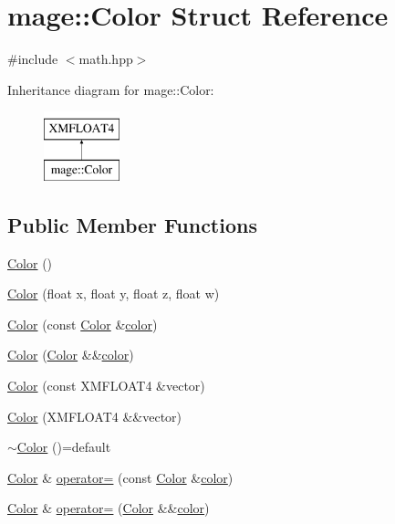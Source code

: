 \hypertarget{structmage_1_1_color}{}\section{mage\+:\+:Color Struct Reference}
\label{structmage_1_1_color}


{\ttfamily \#include $<$math.\+hpp$>$}

Inheritance diagram for mage\+:\+:Color\+:\begin{figure}[H]
\begin{center}
\leavevmode
\includegraphics[height=2.000000cm]{structmage_1_1_color}
\end{center}
\end{figure}
\subsection*{Public Member Functions}
\begin{DoxyCompactItemize}
\item 
\hyperlink{structmage_1_1_color_aacf48e59425346eb80e7592bbcd6b55d}{Color} ()
\item 
\hyperlink{structmage_1_1_color_ae906a0c456f1d21df8a6d5476918a913}{Color} (float x, float y, float z, float w)
\item 
\hyperlink{structmage_1_1_color_aabf202b6ec0c2d1fc788c9bc69f185ff}{Color} (const \hyperlink{structmage_1_1_color}{Color} \&\hyperlink{namespacemage_a56eceea5a9bceb2b56073f3ea4945781}{color})
\item 
\hyperlink{structmage_1_1_color_abb0838db7c77053894fcf11b03284549}{Color} (\hyperlink{structmage_1_1_color}{Color} \&\&\hyperlink{namespacemage_a56eceea5a9bceb2b56073f3ea4945781}{color})
\item 
\hyperlink{structmage_1_1_color_ab70f74c89738d5d60a8ac2c46c0be69e}{Color} (const X\+M\+F\+L\+O\+A\+T4 \&vector)
\item 
\hyperlink{structmage_1_1_color_a7964a671b96af185dd60f92703a578b5}{Color} (X\+M\+F\+L\+O\+A\+T4 \&\&vector)
\item 
\hyperlink{structmage_1_1_color_aa4df1c9718b7846adf77fbeed79ac219}{$\sim$\+Color} ()=default
\item 
\hyperlink{structmage_1_1_color}{Color} \& \hyperlink{structmage_1_1_color_a006c8ce9bf69e54598c5981fe79d742c}{operator=} (const \hyperlink{structmage_1_1_color}{Color} \&\hyperlink{namespacemage_a56eceea5a9bceb2b56073f3ea4945781}{color})
\item 
\hyperlink{structmage_1_1_color}{Color} \& \hyperlink{structmage_1_1_color_afe64cf3cf65b5812ac35674917abb12c}{operator=} (\hyperlink{structmage_1_1_color}{Color} \&\&\hyperlink{namespacemage_a56eceea5a9bceb2b56073f3ea4945781}{color})
\end{DoxyCompactItemize}


